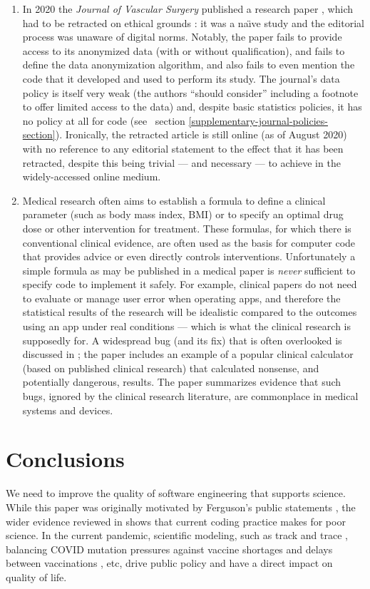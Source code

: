\begin{enumerate}
\item 
In 2020 the \emph{Journal of Vascular Surgery\/} published a research paper \cite{jvs1}, which had to be retracted on ethical grounds \cite{jvs2,jvs3}: it was a na\"\i ve study and the editorial process was unaware of digital norms. Notably, the paper fails to provide access to its anonymized data (with or without qualification), and fails to define the data anonymization algorithm, and also fails to even mention the code that it developed and used to perform its study. The journal's data policy is itself very weak (the authors ``should consider'' including a footnote to offer limited access to the data) and, despite basic statistics policies, it has no policy at all for code (see \supplement\ section \ref{supplementary-journal-policies-section}). Ironically, the retracted article \cite{jvs1} is still online (as of August 2020) with no reference to any editorial statement to the effect that it has been retracted, despite this being trivial --- and necessary --- to achieve in the widely-accessed online medium.

\item
Medical research often aims to establish a formula to define a clinical parameter (such as body mass index, BMI) or to specify an optimal drug dose or other intervention for treatment. These formulas, for which there is conventional clinical evidence, are often used as the basis for computer code that provides advice or even directly controls interventions. Unfortunately a simple formula as may be published in a medical paper is \emph{never\/} sufficient to specify code to implement it safely. For example, clinical papers do not need to evaluate or manage user error when operating apps, and therefore the statistical results of the research will be idealistic compared to the outcomes using an app under real conditions --- which is what the clinical research is supposedly for. A widespread bug (and its fix) that is often overlooked is discussed in \cite{numerals}; the paper includes an example of a popular clinical calculator (based on published clinical research) that calculated nonsense, and potentially dangerous, results. The paper \cite{fda} summarizes evidence that such bugs, ignored by the clinical research literature, are commonplace in medical systems and devices.
\end{enumerate}

\section{Conclusions}
We need to improve the quality of software engineering that supports science. While this paper was originally motivated by Ferguson's public statements , the wider evidence reviewed in shows that current coding practice makes for poor science. In the current pandemic, scientific modeling, such as track and trace \cite{excel-fiasco}, balancing COVID mutation pressures against vaccine shortages and delays between vaccinations \cite{science-delays}, etc, drive public policy and have a direct impact on quality of life.

